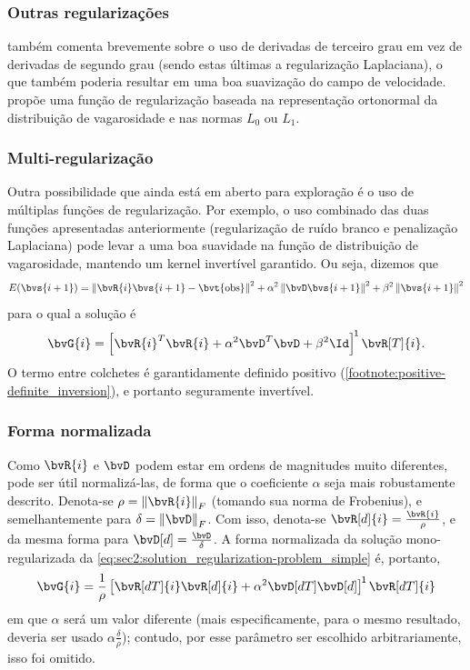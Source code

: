 \subsubsection*{Outras regularizações}
\citet{zhang_nonlinear_1998} também comenta brevemente sobre o uso de derivadas de terceiro grau em vez de derivadas de segundo grau (sendo estas últimas a regularização Laplaciana), o que também poderia resultar em uma boa suavização do campo de velocidade. \citet{hormati_robust_2010} propõe uma função de regularização baseada na representação ortonormal da distribuição de vagarosidade e nas normas $L_0$ ou $L_1$.

\subsubsection*{Multi-regularização}
Outra possibilidade que ainda está em aberto para exploração é o uso de múltiplas funções de regularização. Por exemplo, o uso combinado das duas funções apresentadas anteriormente (regularização de ruído branco e penalização Laplaciana) pode levar a uma boa suavidade na função de distribuição de vagarosidade, mantendo um kernel invertível garantido. Ou seja, dizemos que
\begin{equation}	
	E(\bvs{i+1}) = \norm{\bvR{i} \bvs{i+1} - \bvt{\obs}}^2 + \alpha^2\norm{\bvD\bvs{i+1}}^2 + \beta^2 \norm{\bvs{i+1}}^2
\end{equation}
para o qual a solução é
\begin{equation}	
	\bvG{i} = \inv*{\tr{\bvR{i}} \bvR{i} + \alpha^2 \tr{\bvD}\bvD + \beta^2 \Id} \bvR[T]{i}.
\end{equation}
O termo entre colchetes é garantidamente definido positivo (\cref{footnote:positive-definite_inversion}), e portanto seguramente invertível.

\subsubsection*{Forma normalizada}

Como $\bvR{i}$ e $\bvD$ podem estar em ordens de magnitudes muito diferentes, pode ser útil normalizá-las, de forma que o coeficiente $\alpha$ seja mais robustamente descrito. Denota-se $\rho = \norm{\bvR{i}}_F$ (tomando sua norma de Frobenius), e semelhantemente para $\delta = \norm{\bvD}_F$. Com isso, denota-se $\bvR[d]{i} = \frac{\bvR{i}}{\rho}$, e da mesma forma para $\bvD[d] = \frac{\bvD}{\delta}$. A forma normalizada da solução mono-regularizada da \cref{eq:sec2:solution_regularization-problem_simple} é, portanto,
\begin{equation}
	\bvG{i} = \frac{1}{\rho} \inv*{\bvR[dT]{i} \bvR[d]{i} + \alpha^2 \bvD[dT] \bvD[d]} \bvR[dT]{i}
	\label{eq:sec2:solution_regularization-problem_simple_normalized}
\end{equation}
em que $\alpha$ será um valor diferente (mais especificamente, para o mesmo resultado, deveria ser usado $\alpha \frac{\delta}{\rho}$); contudo, por esse parâmetro ser escolhido arbitrariamente, isso foi omitido.


